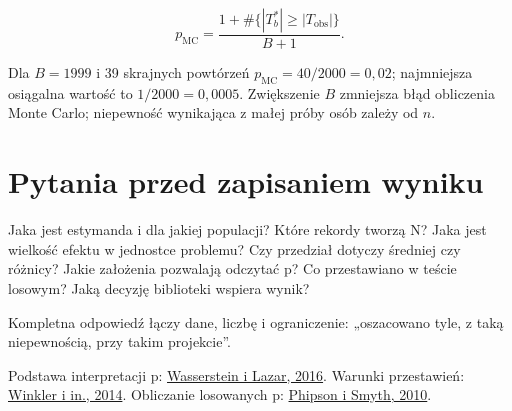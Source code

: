 \documentclass[
  polish,
  11pt,
  a4paper,
]{article}
\begin{document}
\[p_{\mathrm{MC}}=
\frac{1+\#\{|T_b^*|\geq|T_{\mathrm{obs}}|\}}{B+1}.\]

Dla \(B=1999\) i 39 skrajnych powtórzeń
\(p_{\mathrm{MC}}=40/2000=0{,}02\); najmniejsza osiągalna wartość to
\(1/2000=0{,}0005\). Zwiększenie \(B\) zmniejsza błąd obliczenia Monte
Carlo; niepewność wynikająca z małej próby osób zależy od \(n\).

\section{Pytania przed zapisaniem
wyniku}\label{pytania-przed-zapisaniem-wyniku}

Jaka jest estymanda i dla jakiej populacji? Które rekordy tworzą N? Jaka
jest wielkość efektu w jednostce problemu? Czy przedział dotyczy
średniej czy różnicy? Jakie założenia pozwalają odczytać p? Co
przestawiano w teście losowym? Jaką decyzję biblioteki wspiera wynik?

Kompletna odpowiedź łączy dane, liczbę i ograniczenie: „oszacowano tyle,
z taką niepewnością, przy takim projekcie''.

Podstawa interpretacji p:
\href{https://doi.org/10.1080/00031305.2016.1154108}{Wasserstein i
Lazar, 2016}. Warunki przestawień:
\href{https://pmc.ncbi.nlm.nih.gov/articles/PMC4010955/}{Winkler i in.,
2014}. Obliczanie losowanych p:
\href{https://doi.org/10.2202/1544-6115.1585}{Phipson i Smyth, 2010}.
\end{document}
